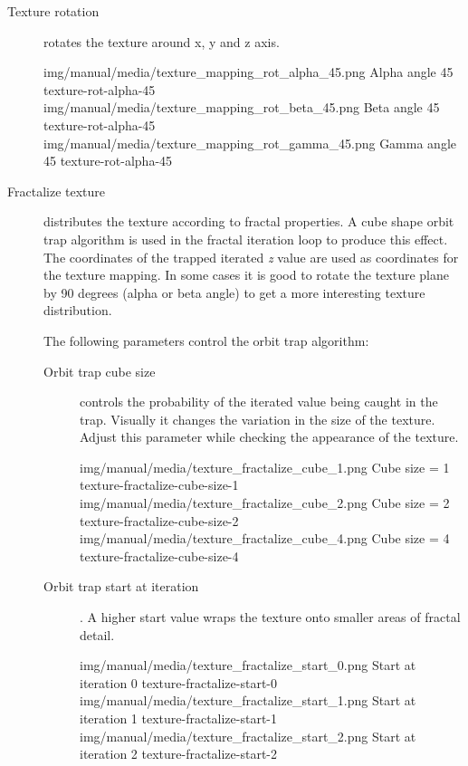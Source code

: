 \begin{description}
	 \item[Texture rotation] rotates the texture around x, y and z axis.
	 
	 \threeImagesWithTwoCaptionsFullWidth
	 {img/manual/media/texture_mapping_rot_alpha_45.png}
	 {Alpha angle 45\textdegree}
	 {texture-rot-alpha-45}
	 {img/manual/media/texture_mapping_rot_beta_45.png}
	 {Beta angle 45\textdegree}
	 {texture-rot-alpha-45}
	 {img/manual/media/texture_mapping_rot_gamma_45.png}
	 {Gamma angle 45\textdegree}
	 {texture-rot-alpha-45}
	 
	 \item[Fractalize texture] distributes the texture according to fractal properties. A cube shape orbit trap algorithm is used in the fractal iteration loop to produce this effect. The coordinates of the trapped iterated \emph{z} value are used as coordinates for the texture mapping. In some cases it is good to rotate the texture plane by 90 degrees (alpha or beta angle) to get a more interesting texture distribution.
	 
	 The following parameters control the orbit trap algorithm:
	 
	 \begin{description}
	 	\item[Orbit trap cube size] controls the probability of the iterated value being caught in the trap. Visually it changes the variation in the size of the texture. Adjust this parameter while checking the appearance of the texture.
	 	
	 	\threeImagesWithTwoCaptionsFullWidth
	 	{img/manual/media/texture_fractalize_cube_1.png}
	 	{Cube size = 1}
	 	{texture-fractalize-cube-size-1}
	 	{img/manual/media/texture_fractalize_cube_2.png}
	 	{Cube size = 2}
		{texture-fractalize-cube-size-2}
	 	{img/manual/media/texture_fractalize_cube_4.png}
	 	{Cube size = 4}
	 	{texture-fractalize-cube-size-4}
	 	
	 	\item[Orbit trap start at iteration]. A higher start value wraps the texture onto smaller areas of fractal detail.
	 	
	 	\threeImagesWithTwoCaptionsFullWidth
	 	{img/manual/media/texture_fractalize_start_0.png}
	 	{Start at iteration 0}
	 	{texture-fractalize-start-0}
	 	{img/manual/media/texture_fractalize_start_1.png}
	 	{Start at iteration 1}
	 	{texture-fractalize-start-1}
	 	{img/manual/media/texture_fractalize_start_2.png}
	 	{Start at iteration 2}
	 	{texture-fractalize-start-2}
	 	
	 \end{description}
	 
	 
	
 \end{description}




